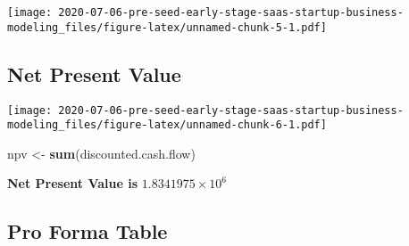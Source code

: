 \documentclass[
]{article}
\newenvironment{Shaded}{\begin{snugshade}}{\end{snugshade}}
\newcommand{\DataTypeTok}[1]{\textcolor[rgb]{0.13,0.29,0.53}{#1}}
\newcommand{\DecValTok}[1]{\textcolor[rgb]{0.00,0.00,0.81}{#1}}
\newcommand{\KeywordTok}[1]{\textcolor[rgb]{0.13,0.29,0.53}{\textbf{#1}}}
\newcommand{\NormalTok}[1]{#1}
\newcommand{\OperatorTok}[1]{\textcolor[rgb]{0.81,0.36,0.00}{\textbf{#1}}}
\newcommand{\StringTok}[1]{\textcolor[rgb]{0.31,0.60,0.02}{#1}}
\begin{document}
\texttt{[image: 2020-07-06-pre-seed-early-stage-saas-startup-business-modeling\_files/figure-latex/unnamed-chunk-5-1.pdf]}

\hypertarget{net-present-value}{%
\subsection{Net Present Value}\label{net-present-value}}

\begin{Shaded}
\end{Shaded}

\texttt{[image: 2020-07-06-pre-seed-early-stage-saas-startup-business-modeling\_files/figure-latex/unnamed-chunk-6-1.pdf]}

\begin{Shaded}
\begin{Highlighting}[]
\NormalTok{npv <-}\StringTok{ }\KeywordTok{sum}\NormalTok{(discounted.cash.flow)}
\end{Highlighting}
\end{Shaded}

\textbf{Net Present Value is} \ensuremath{1.8341975\times 10^{6}}

\hypertarget{pro-forma-table-1}{%
\subsection{Pro Forma Table}\label{pro-forma-table-1}}
\end{document}
